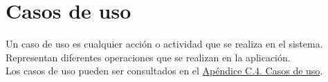 \section{Casos de uso}

Un caso de uso \cite{casodeuso} es cualquier acción o actividad que se realiza en el sistema. Representan diferentes operaciones que se realizan en la aplicación.
\\

Los casos de uso pueden ser consultados en el \hyperref[APCasosUso]{Apéndice C.4. Casos de uso}.